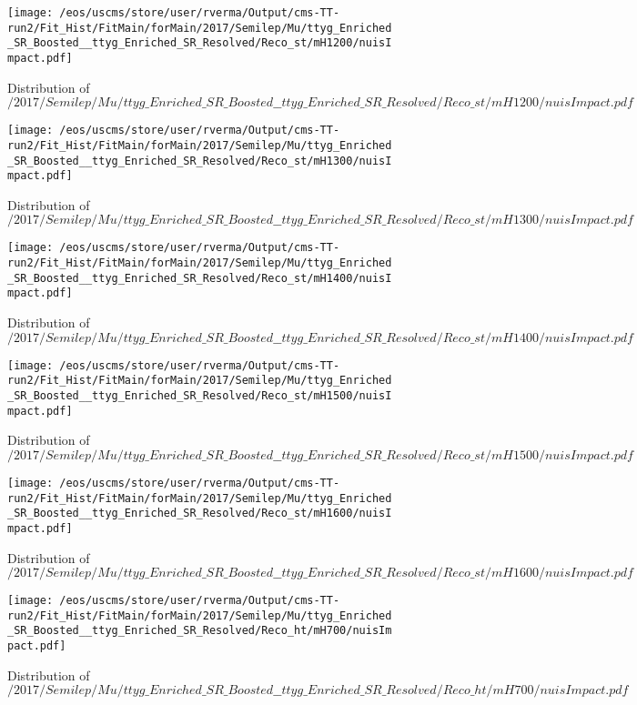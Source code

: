 \begin{figure}
\centering
\texttt{[image: /eos/uscms/store/user/rverma/Output/cms-TT-run2/Fit\_Hist/FitMain/forMain/2017/Semilep/Mu/ttyg\_Enriched\_SR\_Boosted\_\_ttyg\_Enriched\_SR\_Resolved/Reco\_st/mH1200/nuisImpact.pdf]}
\caption{Distribution of $/2017/Semilep/Mu/ttyg\_Enriched\_SR\_Boosted\_\_ttyg\_Enriched\_SR\_Resolved/Reco\_st/mH1200/nuisImpact.pdf$}
\end{figure}

\begin{figure}
\centering
\texttt{[image: /eos/uscms/store/user/rverma/Output/cms-TT-run2/Fit\_Hist/FitMain/forMain/2017/Semilep/Mu/ttyg\_Enriched\_SR\_Boosted\_\_ttyg\_Enriched\_SR\_Resolved/Reco\_st/mH1300/nuisImpact.pdf]}
\caption{Distribution of $/2017/Semilep/Mu/ttyg\_Enriched\_SR\_Boosted\_\_ttyg\_Enriched\_SR\_Resolved/Reco\_st/mH1300/nuisImpact.pdf$}
\end{figure}

\begin{figure}
\centering
\texttt{[image: /eos/uscms/store/user/rverma/Output/cms-TT-run2/Fit\_Hist/FitMain/forMain/2017/Semilep/Mu/ttyg\_Enriched\_SR\_Boosted\_\_ttyg\_Enriched\_SR\_Resolved/Reco\_st/mH1400/nuisImpact.pdf]}
\caption{Distribution of $/2017/Semilep/Mu/ttyg\_Enriched\_SR\_Boosted\_\_ttyg\_Enriched\_SR\_Resolved/Reco\_st/mH1400/nuisImpact.pdf$}
\end{figure}

\begin{figure}
\centering
\texttt{[image: /eos/uscms/store/user/rverma/Output/cms-TT-run2/Fit\_Hist/FitMain/forMain/2017/Semilep/Mu/ttyg\_Enriched\_SR\_Boosted\_\_ttyg\_Enriched\_SR\_Resolved/Reco\_st/mH1500/nuisImpact.pdf]}
\caption{Distribution of $/2017/Semilep/Mu/ttyg\_Enriched\_SR\_Boosted\_\_ttyg\_Enriched\_SR\_Resolved/Reco\_st/mH1500/nuisImpact.pdf$}
\end{figure}

\begin{figure}
\centering
\texttt{[image: /eos/uscms/store/user/rverma/Output/cms-TT-run2/Fit\_Hist/FitMain/forMain/2017/Semilep/Mu/ttyg\_Enriched\_SR\_Boosted\_\_ttyg\_Enriched\_SR\_Resolved/Reco\_st/mH1600/nuisImpact.pdf]}
\caption{Distribution of $/2017/Semilep/Mu/ttyg\_Enriched\_SR\_Boosted\_\_ttyg\_Enriched\_SR\_Resolved/Reco\_st/mH1600/nuisImpact.pdf$}
\end{figure}

\begin{figure}
\centering
\texttt{[image: /eos/uscms/store/user/rverma/Output/cms-TT-run2/Fit\_Hist/FitMain/forMain/2017/Semilep/Mu/ttyg\_Enriched\_SR\_Boosted\_\_ttyg\_Enriched\_SR\_Resolved/Reco\_ht/mH700/nuisImpact.pdf]}
\caption{Distribution of $/2017/Semilep/Mu/ttyg\_Enriched\_SR\_Boosted\_\_ttyg\_Enriched\_SR\_Resolved/Reco\_ht/mH700/nuisImpact.pdf$}
\end{figure}

